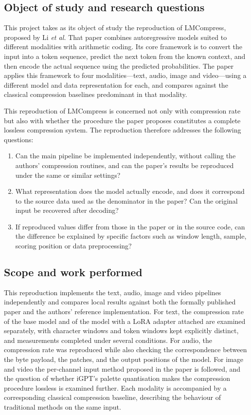 \documentclass[12pt,a4paper]{article}
\begin{document}
\subsection{Object of study and research questions}

This project takes as its object of study the reproduction of LMCompress, proposed by Li
\emph{et al.} That paper combines autoregressive models suited to different modalities with
arithmetic coding. Its core framework is to convert the input into a token sequence, predict
the next token from the known context, and then encode the actual sequence using the
predicted probabilities. The paper applies this framework to four modalities---text, audio,
image and video---using a different model and data representation for each, and compares
against the classical compression baselines predominant in that modality.

This reproduction of LMCompress is concerned not only with compression rate but also with
whether the procedure the paper proposes constitutes a complete lossless compression system.
The reproduction therefore addresses the following questions:

\begin{enumerate}[label=\arabic*.,leftmargin=*]
  \item Can the main pipeline be implemented independently, without calling the authors'
        compression routines, and can the paper's results be reproduced under the same or
        similar settings?
  \item What representation does the model actually encode, and does it correspond to the
        source data used as the denominator in the paper? Can the original input be
        recovered after decoding?
  \item If reproduced values differ from those in the paper or in the source code, can the
        difference be explained by specific factors such as window length, sample, scoring
        position or data preprocessing?
\end{enumerate}

\subsection{Scope and work performed}

This reproduction implements the text, audio, image and video pipelines independently and
compares local results against both the formally published paper and the authors' reference
implementation. For text, the compression rate of the base model and of the model with a
LoRA adapter attached are examined separately, with character windows and token windows
kept explicitly distinct, and measurements completed under several conditions. For audio,
the compression rate was reproduced while also checking the correspondence between the byte
payload, the patches, and the output positions of the model. For image and video the
per-channel input method proposed in the paper is followed, and the question of whether
iGPT's palette quantisation makes the compression procedure lossless is examined further.
Each modality is accompanied by a corresponding classical compression baseline, describing
the behaviour of traditional methods on the same input.
\end{document}
